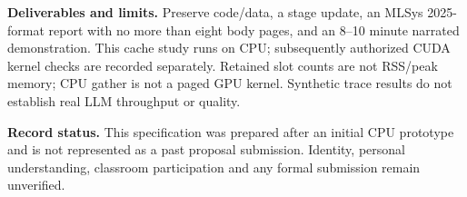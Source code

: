 \documentclass[10pt]{article}
\begin{document}
\textbf{Deliverables and limits.} Preserve code/data, a stage update, an MLSys 2025-format report with no more than eight body pages, and an 8--10 minute narrated demonstration. This cache study runs on CPU; subsequently authorized CUDA kernel checks are recorded separately. Retained slot counts are not RSS/peak memory; CPU gather is not a paged GPU kernel. Synthetic trace results do not establish real LLM throughput or quality.

\textbf{Record status.} This specification was prepared after an initial CPU prototype and is not represented as a past proposal submission. Identity, personal understanding, classroom participation and any formal submission remain unverified.
\end{document}
